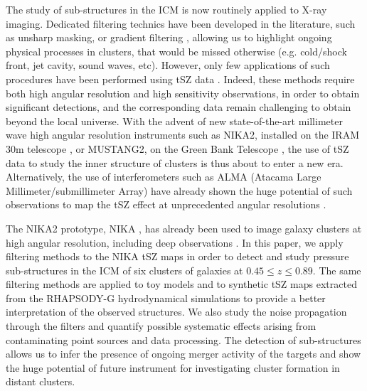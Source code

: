 \documentclass[twocolumn,traditabstract]{aa}
\begin{document}
The study of sub-structures in the ICM is now routinely applied to X-ray imaging. Dedicated filtering technics have been developed in the literature, such as unsharp masking, or gradient filtering \citep[see, for example, recent results by][]{Sanders2016}, allowing us to highlight ongoing physical processes in clusters, that would be missed otherwise (e.g. cold/shock front, jet cavity, sound waves, etc). However, only few applications of such procedures have been performed using tSZ data \citep[see e.g.][using simulated nearby Planck clusters]{Bourdin2015}. Indeed, these methods require both high angular resolution and high sensitivity observations, in order to obtain significant detections, and the corresponding data remain challenging to obtain beyond the local universe. With the advent of new state-of-the-art millimeter wave high angular resolution instruments such as NIKA2, installed on the IRAM 30m telescope \citep[The New IRAM KIDs Array 2, $< 20$ arcsec resolution at 150 and 260 GHz,][]{Calvo2016,Catalano2016,NIKA2017}, or MUSTANG2, on the Green Bank Telescope \citep[The MUltiplexed Squid Tes Array at Ninety Gigahertzh 2, $\sim 8$ arcsec at 90 GHz,][]{Dicker2014}, the use of tSZ data to study the inner structure of clusters is thus about to enter a new era. Alternatively, the use of interferometers such as ALMA (Atacama Large Millimeter/submillimeter Array) have already shown the huge potential of such observations to map the tSZ effect at unprecedented angular resolutions \citep{Kitayama2016,Basu2016}.

The NIKA2 prototype, NIKA \citep{Monfardini2011,Catalano2014}, has already been used to image galaxy clusters at high angular resolution, including deep observations \citep{Adam2014,Adam2015,Adam2016a,Adam2016b,Ruppin2016}. In this paper, we apply filtering methods to the NIKA tSZ maps in order to detect and study pressure sub-structures in the ICM of six clusters of galaxies at $0.45 \leq z \leq 0.89$. The same filtering methods are applied to toy models and to synthetic tSZ maps extracted from the RHAPSODY-G hydrodynamical simulations \citep{Wu2013,Hahn2017} to provide a better interpretation of the observed structures. We also study the noise propagation through the filters and quantify possible systematic effects arising from contaminating point sources and data processing. The detection of sub-structures allows us to infer the presence of ongoing merger activity of the targets and show the huge potential of future instrument for investigating cluster formation in distant clusters.
\end{document}
